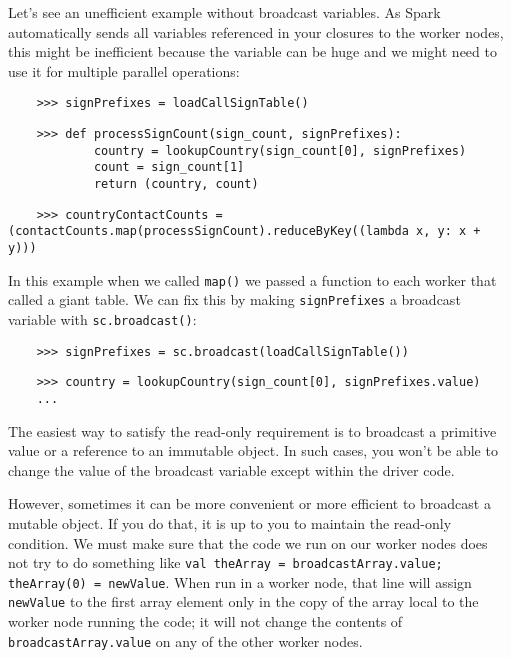 Let's see an unefficient example without broadcast variables. As Spark automatically sends all variables referenced in your closures to the worker nodes, this might be inefficient because the variable can be huge and we might need to use it for multiple parallel operations:

\begin{lstlisting}
    >>> signPrefixes = loadCallSignTable()
\end{lstlisting}

\begin{lstlisting}
    >>> def processSignCount(sign_count, signPrefixes):
            country = lookupCountry(sign_count[0], signPrefixes)
            count = sign_count[1]
            return (country, count)
\end{lstlisting}

\begin{lstlisting}
    >>> countryContactCounts = (contactCounts.map(processSignCount).reduceByKey((lambda x, y: x + y)))
\end{lstlisting}

In this example when we called \texttt{map()} we passed a function to each worker that called a giant table. We can fix this by making \texttt{signPrefixes} a broadcast variable with \texttt{sc.broadcast()}:

\begin{lstlisting}
    >>> signPrefixes = sc.broadcast(loadCallSignTable())
\end{lstlisting}

\begin{lstlisting}
    >>> country = lookupCountry(sign_count[0], signPrefixes.value)
    ...
\end{lstlisting}


The easiest way to satisfy the read-only requirement is to broadcast a primitive value or a reference to an immutable object. In such cases, you won't be able to change the value of the broadcast variable except within the driver code.

However, sometimes it can be more convenient or more efficient to broadcast a mutable object. If you do that, it is up to you to maintain the read-only condition. We must make sure that the code we run on our worker nodes does not try to do something like \texttt{val theArray = broadcastArray.value;} \texttt{theArray(0) = newValue}. When run in a worker node, that line will assign \texttt{newValue} to the first array element only in the copy of the array local to the worker node running the code; it will not change the contents of \texttt{broadcastArray.value} on any of the other worker nodes.
